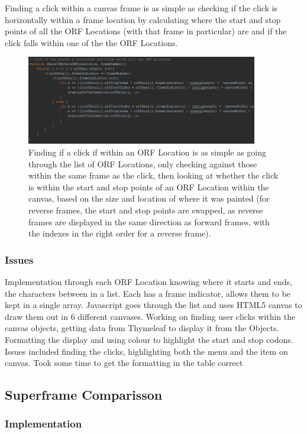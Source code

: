 Finding a click within a canvas frame is as simple as checking if the click is horizontally within a frame location by calculating where the start and stop points of all the ORF Locations (with that frame in particular) are and if the click falls within one of the the ORF Locations.

\begin{figure}[H]
\centering
\includegraphics[width=0.9\textwidth]{images/orfdisplay1}
\caption{Finding if a click if within an ORF Location is as simple as going through the list of ORF Locations, only checking against those within the same frame as the click, then looking at whether the click is within the start and stop points of an ORF Location within the canvas, based on the size and location of where it was painted (for reverse frames, the start and stop points are swapped, as reverse frames are displayed in the same direction as forward frames, with the indexes in the right order for a reverse frame).}
\end{figure}

\subsubsection{Issues}
Implementation through each ORF Location knowing where it starts and ends, the characters between in a list. Each has a frame indicator, allows them to be kept in a single array. Javascript goes through the list and uses HTML5 canvas to draw them out in 6 different canvases. Working on finding user clicks within the canvas objects, getting data from Thymeleaf to display it from the Objects. Formatting the display and using colour to highlight the start and stop codons.
Issues included finding the clicks, highlighting both the menu and the item on canvas. Took some time to get the formatting in the table correct

\subsection{Superframe Comparisson}
\subsubsection{Implementation}
